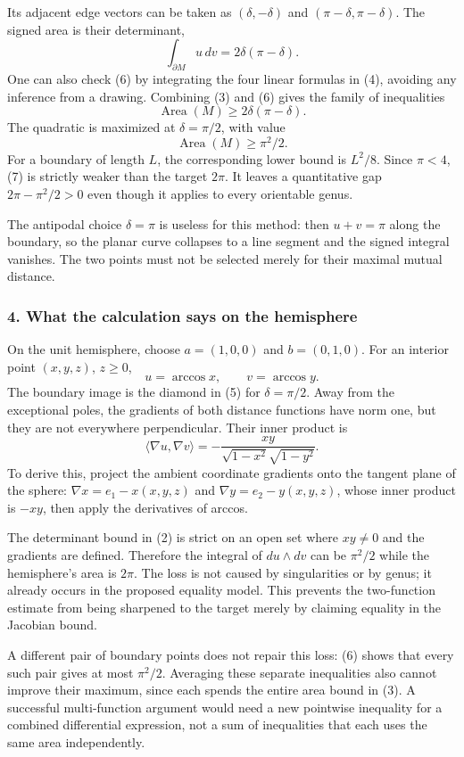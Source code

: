 \documentclass[11pt]{article}
\begin{document}
Its adjacent edge vectors can be taken as
$(\delta,-\delta)$ and $(\pi-\delta,\pi-\delta)$. The signed area is their determinant,
\[
 \int_{\partial M}u\,dv=2\delta(\pi-\delta).           \tag{6}
\]
One can also check (6) by integrating the four linear formulas in (4), avoiding any inference from a drawing. Combining (3) and (6) gives the family of inequalities
\[
 \operatorname{Area}(M)\ge2\delta(\pi-\delta).
\]
The quadratic is maximized at $\delta=\pi/2$, with value
\[
 \boxed{\operatorname{Area}(M)\ge\pi^2/2.}             \tag{7}
\]
For a boundary of length $L$, the corresponding lower bound is $L^2/8$. Since $\pi<4$, (7) is strictly weaker than the target $2\pi$. It leaves a quantitative gap $2\pi-\pi^2/2>0$ even though it applies to every orientable genus.

The antipodal choice $\delta=\pi$ is useless for this method: then $u+v=\pi$ along the boundary, so the planar curve collapses to a line segment and the signed integral vanishes. The two points must not be selected merely for their maximal mutual distance.

\subsubsection{4. What the calculation says on the hemisphere}
On the unit hemisphere, choose $a=(1,0,0)$ and $b=(0,1,0)$. For an interior point $(x,y,z)$, $z\ge0$,
\[
 u=\arccos x,\qquad v=\arccos y.
\]
The boundary image is the diamond in (5) for $\delta=\pi/2$. Away from the exceptional poles, the gradients of both distance functions have norm one, but they are not everywhere perpendicular. Their inner product is
\[
 \langle\nabla u,\nabla v\rangle
 =-\frac{xy}{\sqrt{1-x^2}\sqrt{1-y^2}}.                \tag{8}
\]
To derive this, project the ambient coordinate gradients onto the tangent plane of the sphere: $\nabla x=e_1-x(x,y,z)$ and $\nabla y=e_2-y(x,y,z)$, whose inner product is $-xy$, then apply the derivatives of arccos.

The determinant bound in (2) is strict on an open set where $xy\ne0$ and the gradients are defined. Therefore the integral of $du\wedge dv$ can be $\pi^2/2$ while the hemisphere's area is $2\pi$. The loss is not caused by singularities or by genus; it already occurs in the proposed equality model. This prevents the two-function estimate from being sharpened to the target merely by claiming equality in the Jacobian bound.

A different pair of boundary points does not repair this loss: (6) shows that every such pair gives at most $\pi^2/2$. Averaging these separate inequalities also cannot improve their maximum, since each spends the entire area bound in (3). A successful multi-function argument would need a new pointwise inequality for a combined differential expression, not a sum of inequalities that each uses the same area independently.
\end{document}
